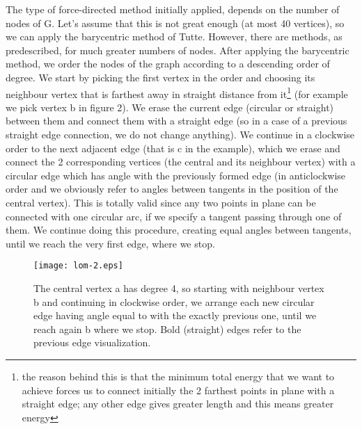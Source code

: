 \documentclass[10pt]{article}
\begin{document}
The type of force-directed method initially applied, depends on the number of nodes of G. Let's assume that this is not great enough (at most 40 vertices), so we can apply the barycentric method of Tutte. However, there are methods, as predescribed, for much greater numbers of nodes. After applying the barycentric method, we order the nodes of the graph according to a descending order of degree. We start by picking the first vertex in the order and choosing its neighbour vertex that is farthest away in straight distance from it\footnote{the reason behind this is that the minimum total energy that we want to achieve forces us to connect initially the 2 farthest points in plane with a straight edge; any other edge gives greater length and this means greater energy} (for example we pick vertex b in figure 2). We erase the current edge (circular or straight) between them and connect them with a straight edge (so in a case of a previous straight edge connection, we do not change anything). We continue in a clockwise order to the next adjacent edge (that is c in the example), which we erase and connect the 2 corresponding vertices (the central and its neighbour vertex) with a circular edge which has angle  with the previously formed edge (in anticlockwise order and we obviously refer to angles between tangents in the position of the central vertex). This is totally valid since any two points in plane can be connected with one circular arc, if we specify a tangent passing through one of them. We continue doing this procedure, creating equal angles between tangents, until we reach the very first edge, where we stop.


\begin{figure}
\begin{center}
\texttt{[image: lom-2.eps]}
\caption{The central vertex a has degree 4, so starting with neighbour vertex b and continuing in clockwise order, we arrange each new circular edge having angle equal to  with the exactly previous one, until we reach again b where we stop. Bold (straight) edges refer to the previous edge visualization.}
\end{center}
\end{figure}
\end{document}
